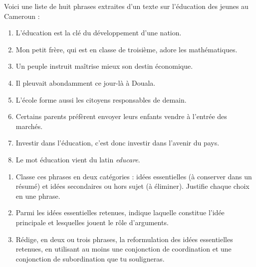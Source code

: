 \documentclass[11pt]{article}
\begin{document}
\begin{exercice}
Voici une liste de huit phrases extraites d'un texte sur l'éducation des jeunes au Cameroun :

\begin{enumerate}
\item[a.] L'éducation est la clé du développement d'une nation.
\item[b.] Mon petit frère, qui est en classe de troisième, adore les mathématiques.
\item[c.] Un peuple instruit maîtrise mieux son destin économique.
\item[d.] Il pleuvait abondamment ce jour-là à Douala.
\item[e.] L'école forme aussi les citoyens responsables de demain.
\item[f.] Certains parents préfèrent envoyer leurs enfants vendre à l'entrée des marchés.
\item[g.] Investir dans l'éducation, c'est donc investir dans l'avenir du pays.
\item[h.] Le mot \og éducation \fg{} vient du latin \textit{educare}.
\end{enumerate}

\begin{enumerate}
\item Classe ces phrases en deux catégories : idées essentielles (à conserver dans un résumé) et idées secondaires ou hors sujet (à éliminer). Justifie chaque choix en une phrase.
\item Parmi les idées essentielles retenues, indique laquelle constitue l'idée principale et lesquelles jouent le rôle d'arguments.
\item Rédige, en deux ou trois phrases, la reformulation des idées essentielles retenues, en utilisant au moins une conjonction de coordination et une conjonction de subordination que tu souligneras.
\end{enumerate}
\end{exercice}
\end{document}
